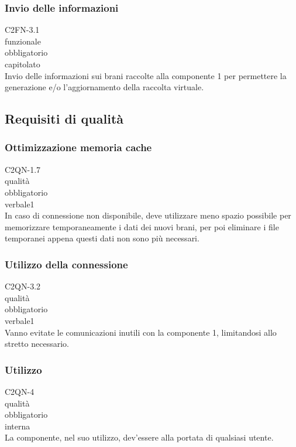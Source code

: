 \subsubsection*{Invio delle informazioni}
 C2FN-3.1 \\
 funzionale \\
 obbligatorio \\
 capitolato \\
Invio delle informazioni sui brani raccolte alla componente 1 per permettere la
generazione e/o l'aggiornamento della raccolta virtuale.

\subsection{Requisiti di qualit\`a}
\subsubsection*{Ottimizzazione memoria cache}
 C2QN-1.7 \\
 qualit\`a \\
 obbligatorio \\
 verbale1 \\
In caso di connessione non disponibile, deve utilizzare meno spazio possibile
per memorizzare temporaneamente i dati dei nuovi brani, per poi eliminare i file
temporanei appena questi dati non sono pi\`u necessari.

\subsubsection*{Utilizzo della connessione}
 C2QN-3.2 \\
 qualit\`a \\
 obbligatorio \\
 verbale1 \\
Vanno evitate le comunicazioni inutili con la componente 1, limitandosi allo
stretto necessario.

\subsubsection*{Utilizzo}
 C2QN-4\\
 qualit\`a \\
 obbligatorio \\
 interna \\
La componente, nel suo utilizzo, dev'essere alla portata di qualsiasi utente.

